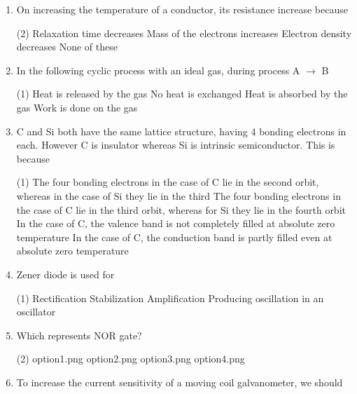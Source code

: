 \documentclass[twocolumn]{article}
\begin{document}
\begin{enumerate}
    \item On increasing the temperature of a conductor, its resistance increase because
    \begin{tasks}(2)
        \task Relaxation time decreases
        \task Mass of the electrons increases
        \task Electron density decreases
        \task None of these
    \end{tasks}
    \item In the following cyclic process with an ideal gas, during process A $\rightarrow$ B
    \begin{tasks}(1)
        \task Heat is released by the gas
        \task No heat is exchanged
        \task Heat is absorbed by the gas
        \task Work is done on the gas
    \end{tasks}
    \begin{center}
    \end{center}
    \item C and Si both have the same lattice structure, having 4 bonding electrons in each. However C is insulator whereas Si is intrinsic semiconductor. This is because
    \begin{tasks}(1)
        \task The four bonding electrons in the case of C lie in the second orbit, whereas in the case of Si they lie in the third
        \task The four bonding electrons in the case of C lie in the third orbit, whereas for Si they lie in the fourth orbit
        \task In the case of C, the valence band is not completely filled at absolute zero temperature
        \task In the case of C, the conduction band is partly filled even at absolute zero temperature
    \end{tasks}
    \item Zener diode is used for
    \begin{tasks}(1)
        \task Rectification
        \task Stabilization
        \task Amplification
        \task Producing oscillation in an oscillator
    \end{tasks}
    \item Which represents NOR gate?
    \begin{tasks}(2)
        \task option1.png
        \task option2.png
        \task option3.png
        \task option4.png
    \end{tasks}
    \item To increase the current sensitivity of a moving coil galvanometer, we should

\end{enumerate}
\end{document}
